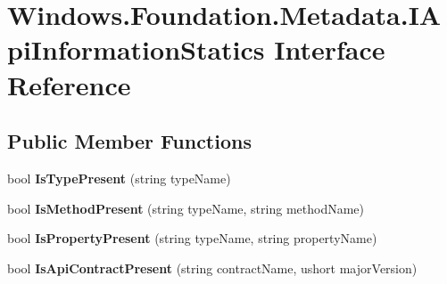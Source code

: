 \hypertarget{interface_windows_1_1_foundation_1_1_metadata_1_1_i_api_information_statics}{}\section{Windows.\+Foundation.\+Metadata.\+I\+Api\+Information\+Statics Interface Reference}
\label{interface_windows_1_1_foundation_1_1_metadata_1_1_i_api_information_statics}
\subsection*{Public Member Functions}
\begin{DoxyCompactItemize}
\item 
\mbox{\label{interface_windows_1_1_foundation_1_1_metadata_1_1_i_api_information_statics_a624a3c7f88248db447de8e71c6d40969}} 
bool {\bfseries Is\+Type\+Present} (string type\+Name)
\item 
\mbox{\label{interface_windows_1_1_foundation_1_1_metadata_1_1_i_api_information_statics_a551de0a63c04169be958fc08bb53e498}} 
bool {\bfseries Is\+Method\+Present} (string type\+Name, string method\+Name)
\item 
\mbox{\label{interface_windows_1_1_foundation_1_1_metadata_1_1_i_api_information_statics_aca08751223a05e1bef2211bddbfc48b3}} 
bool {\bfseries Is\+Property\+Present} (string type\+Name, string property\+Name)
\item 
\mbox{\label{interface_windows_1_1_foundation_1_1_metadata_1_1_i_api_information_statics_a7fca31115e40e05294977921f9cbf369}} 
bool {\bfseries Is\+Api\+Contract\+Present} (string contract\+Name, ushort major\+Version)
\item 
\mbox{\label{interface_windows_1_1_foundation_1_1_metadata_1_1_i_api_information_statics_abd1e942e837a914ecc123132f440c117}} 

\end{DoxyCompactItemize}
